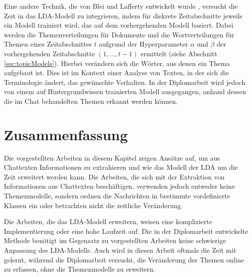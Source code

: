 Eine andere Technik, die von Blei und Lafferty entwickelt wurde \citep{dynamicTopicModels}, versucht die Zeit in das LDA-Modell zu integrieren, indem für diskrete Zeitabschnitte jeweils ein Modell trainiert wird, das auf dem vorhergehenden Modell basiert. Dabei werden die Themenverteilungen für Dokumente und die Wortverteilungen für Themen eines Zeitabschnittes $t$ aufgrund der Hyperparameter $\alpha$ und $\beta$ der vorhergehenden Zeitabschnitte $(1,\ldots,t-1)$ ermittelt (siehe Abschnitt \ref{sec:topicModels}). Hierbei verändern sich die Wörter, aus denen ein Thema aufgebaut ist. Dies ist im Kontext einer Analyse von Texten, in der sich die Terminologie ändert, das gewünschte Verhalten. In der Diplomarbeit wird jedoch von einem auf Hintergrundwissen trainierten Modell ausgegangen, anhand dessen die im Chat behandelten Themen erkannt werden können. 

\section{Zusammenfassung}
Die vorgestellten Arbeiten in diesem Kapitel zeigen Ansätze auf, um aus Chattexten Informationen zu extrahieren und wie das Modell der LDA um die Zeit erweitert werden kann. Die Arbeiten, die sich mit der Extraktion von Informationen aus Chattexten beschäftigen, verwenden jedoch entweder keine Themenmodelle, sondern ordnen die Nachrichten in bestimmte vordefinierte Klassen ein oder betrachten nicht die zeitliche Veränderung. 

Die Arbeiten, die das LDA-Modell erweitern, weisen eine komplizierte Implementierung oder eine hohe Laufzeit auf. Die in der Diplomarbeit entwickelte Methode benötigt im Gegensatz zu vorgestellten Arbeiten keine schwierige Anpassung des LDA-Modells. Auch wird in diesen Arbeit oftmals die Zeit mit gelernt, während die Diplomarbeit versucht, die Veränderung der Themen online zu erfassen, ohne die Themenmodelle zu erweitern.   


